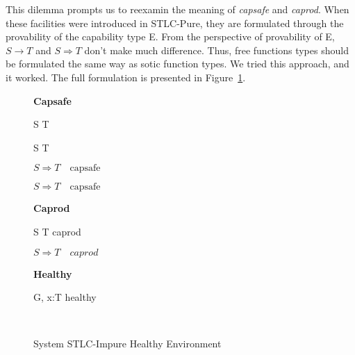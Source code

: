 This dilemma prompts us to reexamin the meaning of \emph{capsafe} and
\emph{caprod}. When these facilities were introduced in STLC-Pure, they
are formulated through the provability of the capability type E. From
the perspective of provability of E, $S \to T$ and $S \Rightarrow T$
don't make much difference. Thus, free functions types should be
formulated the same way as sotic function types. We tried this
approach, and it worked. The full formulation is presented in
Figure~\ref{fig:stlc-impure-healthy-definition}.

\begin{figure}[h]
\begin{framed}

\setlength{\columnseprule}{0.4pt}
\begin{multicols}{2}

\textbf{Capsafe}


{ S \to T \quad {} }

{ S \to T \quad {} }

{ \colorbox{shade}{$S \Rightarrow T \quad \text{capsafe}$} }

{ \colorbox{shade}{$S \Rightarrow T \quad \text{capsafe}$} }

\columnbreak

\textbf{Caprod}


{ S \to T \quad caprod }

{ \colorbox{shade}{$S \Rightarrow T \quad caprod$} }

\textbf{Healthy}


{ G, \; x:T \quad healthy }

\hfill\\

\end{multicols}
\end{framed}

\caption{System STLC-Impure Healthy Environment}
\label{fig:stlc-impure-healthy-definition}
\end{figure}

